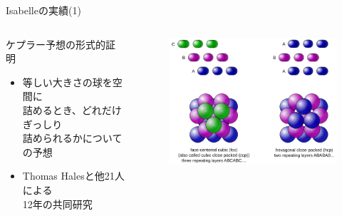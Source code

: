 \documentclass[17pt,aspectratio=169]{beamer}
\begin{document}
\begin{frame}{Isabelleの実績(1)}
    \begin{columns}
        \begin{column}{0.75\textwidth} 
            ケプラー予想の形式的証明
            {\small \begin{itemize}[itemsep=5pt]
                \item 等しい大きさの球を空間に \\
                        詰めるとき、どれだけぎっしり\\
                        詰められるかについての予想
                \item Thomas Halesと他21人による\\
                        12年の共同研究 
                
            \end{itemize} } 
        \end{column}
        \begin{column}{0.25\textwidth}
            \begin{figure}
                \hspace{-2cm}
                \includegraphics[width=1.4\linewidth]{./images/kepler.png }
            \end{figure}
        \end{column}
    \end{columns}
\end{frame}
\end{document}

